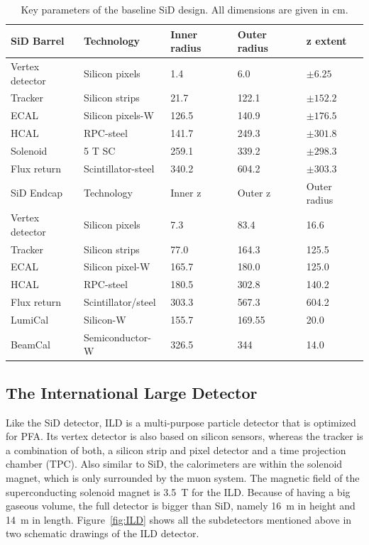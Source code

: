 \begin{table}
\caption{Key parameters of the baseline SiD design. All dimensions are given in cm.\cite{SiDBkgNote}}
\label{tab:KeyParametersSiD}
\centering
\begin{tabularx}{0.81\textwidth}{l|llll}
\hline\hline
SiD Barrel & Technology & Inner radius & Outer radius & z extent\\
\hline
Vertex detector & Silicon pixels & 1.4 & 6.0 & $\pm 6.25$ \\
Tracker & Silicon strips & 21.7 & 122.1 & $\pm 152.2$ \\
ECAL & Silicon pixels-W & 126.5 & 140.9 & $\pm 176.5$ \\
HCAL & RPC-steel & 141.7 & 249.3 & $\pm 301.8$ \\
Solenoid & 5 T SC & 259.1 & 339.2 & $\pm 298.3$ \\
Flux return & Scintillator-steel & 340.2 & 604.2 & $\pm 303.3$ \\
\hline
SiD Endcap & Technology & Inner z & Outer z & Outer radius\\
\hline
Vertex detector & Silicon pixels & 7.3 & 83.4 & 16.6 \\
Tracker & Silicon strips & 77.0 & 164.3 & 125.5 \\
ECAL & Silicon pixel-W & 165.7 & 180.0 & 125.0 \\
HCAL & RPC-steel & 180.5 & 302.8 & 140.2 \\
Flux return & Scintillator/steel & 303.3 & 567.3 & 604.2 \\
LumiCal & Silicon-W & 155.7 & 169.55 &  20.0 \\
BeamCal & Semiconductor-W & 326.5 & 344 & 14.0 \\
\hline\hline
\end{tabularx}
\end{table}

\subsection{The International Large Detector}

Like the SiD detector, ILD is a multi-purpose particle detector that is optimized for PFA.
Its vertex detector is also based on silicon sensors, whereas the tracker is a combination of both, a silicon strip and pixel detector and a time projection chamber (TPC).
Also similar to SiD, the calorimeters are within the solenoid magnet, which is only surrounded by the muon system.
The magnetic field of the superconducting solenoid magnet is \SI{3.5}{T} for the ILD.
Because of having a big gaseous volume, the full detector is bigger than SiD, namely \SI{16}{m} in height and \SI{14}{m} in length.
Figure~\ref{fig:ILD} shows all the subdetectors mentioned above in two schematic drawings of the ILD detector.

